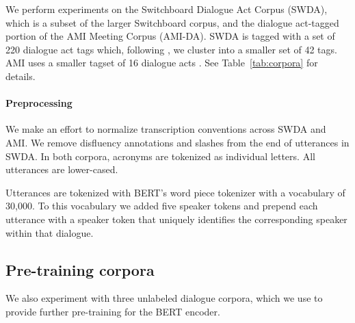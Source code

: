 \documentclass[11pt,a4paper]{article}
\begin{document}
We perform experiments on the Switchboard Dialogue Act Corpus (SWDA), 
which is a subset of the larger Switchboard corpus, 
and the dialogue act-tagged portion of the AMI Meeting Corpus (AMI-DA). 
SWDA is tagged with a set of 220 dialogue act tags which, following  \citet{jurafskySwitchboardSWBDDAMSLShallowDiscourseFunction1997a}, we cluster into a smaller set of 42 tags.
AMI uses a smaller tagset of 16 dialogue acts \citep{Carletta2007}.
See Table~\ref{tab:corpora} for details.


\paragraph{Preprocessing}

We make an effort to normalize transcription conventions across SWDA and AMI.
We remove disfluency annotations and slashes from the end of utterances in SWDA.
In both corpora, acronyms are tokenized as individual letters. 
All utterances are lower-cased.

Utterances are tokenized with BERT's word piece tokenizer with a vocabulary of 30,000.
To this vocabulary we added five speaker tokens and prepend each utterance with a speaker 
token that uniquely identifies the corresponding speaker within that dialogue.


\subsection{Pre-training corpora}

We also experiment with three unlabeled dialogue corpora, which we use to provide further pre-training for the BERT encoder.
\end{document}
